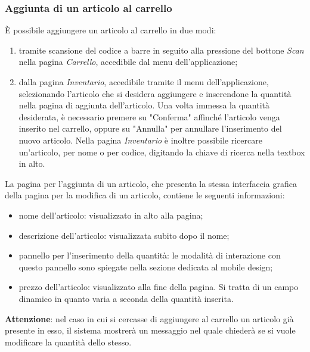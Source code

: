 \documentclass[12pt, a4paper, titlepage]{report}
\begin{document}
	\subsubsection{Aggiunta di un articolo al carrello}
	È possibile aggiungere un articolo al carrello in due modi: 
	\begin{enumerate}
		\item tramite scansione del codice a barre in seguito alla pressione del bottone \textit{Scan} nella pagina \textit{Carrello}, accedibile dal menu dell'applicazione;
		\item dalla pagina \textit{Inventario}, accedibile tramite il menu dell'applicazione, selezionando l'articolo che si desidera aggiungere e inserendone la quantità nella pagina di aggiunta dell'articolo. Una volta immessa la quantità desiderata, è necessario premere su "Conferma" affinché l'articolo venga inserito nel carrello, oppure su "Annulla" per annullare l'inserimento del nuovo articolo. Nella pagina \textit{Inventario} è inoltre possibile ricercare un'articolo, per nome o per codice, digitando la chiave di ricerca nella textbox in alto.
	\end{enumerate}
	La pagina per l'aggiunta di un articolo, che presenta la stessa interfaccia grafica della pagina per la modifica di un articolo, contiene le seguenti informazioni:
	\begin{itemize}
		\item nome dell'articolo: visualizzato in alto alla pagina;
		\item descrizione dell'articolo: visualizzata subito dopo il nome;
		\item pannello per l'inserimento della quantità: le modalità di interazione con questo pannello sono spiegate nella sezione dedicata al mobile design;
		\item prezzo dell'articolo: visualizzato alla fine della pagina. Si tratta di un campo dinamico in quanto varia a seconda della quantità inserita.
	\end{itemize}
	\textbf{Attenzione}: nel caso in cui si cercasse di aggiungere al carrello un articolo già presente in esso, il sistema mostrerà un messaggio nel quale chiederà se si vuole modificare la quantità dello stesso.
	
\end{document}
